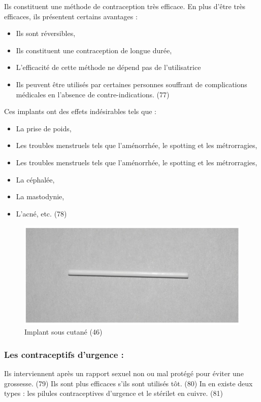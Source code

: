 \noindent Ils constituent une méthode de contraception très efficace. En plus d’être très efficaces, ils présentent certains avantages : 
\begin{itemize}
  \item Ils sont réversibles,
  \item Ils constituent une contraception de longue durée, 
  \item	L’efficacité de cette méthode ne dépend pas de l’utilisatrice
  \item Ils peuvent être utilisés par certaines personnes souffrant de complications médicales en l’absence de contre-indications. (77) 
\end{itemize}

\noindent Ces implants ont des effets indésirables tels que : 

\begin{itemize}
  \item La prise de poids, 
  \item Les troubles menstruels tels que l’aménorrhée, le spotting et les métrorragies,
  \item	Les troubles menstruels tels que l’aménorrhée, le spotting et les métrorragies,
  \item	La céphalée, 
  \item	La mastodynie, 
  \item	L’acné, etc. (78)
\end{itemize}

\begin{figure}[H]
  \centering
  \includegraphics[scale=1.2]{Images/fig_40.jpg}
  \caption{Implant sous cutané (46)}
    
\end{figure}

\subsubsection{Les contraceptifs d’urgence : }
Ils interviennent après un rapport sexuel non ou mal protégé pour éviter une grossesse. (79) Ils sont plus efficaces s’ils sont utilisés tôt. (80) In en existe deux types : les pilules contraceptives d’urgence et le stérilet en cuivre. (81)

